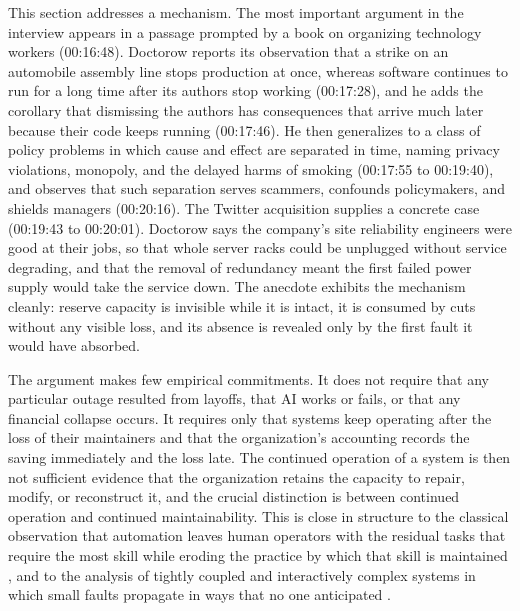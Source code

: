 \documentclass[12pt]{article}
\newcommand{\ts}[1]{(#1)}
\begin{document}
This section addresses a mechanism. The most important argument in the interview appears in a passage prompted by a book on organizing technology workers \ts{00:16:48}. Doctorow reports its observation that a strike on an automobile assembly line stops production at once, whereas software continues to run for a long time after its authors stop working \ts{00:17:28}, and he adds the corollary that dismissing the authors has consequences that arrive much later because their code keeps running \ts{00:17:46}. He then generalizes to a class of policy problems in which cause and effect are separated in time, naming privacy violations, monopoly, and the delayed harms of smoking \ts{00:17:55 to 00:19:40}, and observes that such separation serves scammers, confounds policymakers, and shields managers \ts{00:20:16}. The Twitter acquisition supplies a concrete case \ts{00:19:43 to 00:20:01}. Doctorow says the company's site reliability engineers were good at their jobs, so that whole server racks could be unplugged without service degrading, and that the removal of redundancy meant the first failed power supply would take the service down. The anecdote exhibits the mechanism cleanly: reserve capacity is invisible while it is intact, it is consumed by cuts without any visible loss, and its absence is revealed only by the first fault it would have absorbed.

The argument makes few empirical commitments. It does not require that any particular outage resulted from layoffs, that AI works or fails, or that any financial collapse occurs. It requires only that systems keep operating after the loss of their maintainers and that the organization's accounting records the saving immediately and the loss late. The continued operation of a system is then not sufficient evidence that the organization retains the capacity to repair, modify, or reconstruct it, and the crucial distinction is between continued operation and continued maintainability. This is close in structure to the classical observation that automation leaves human operators with the residual tasks that require the most skill while eroding the practice by which that skill is maintained \cite{bainbridge}, and to the analysis of tightly coupled and interactively complex systems in which small faults propagate in ways that no one anticipated \cite{perrow}.
\end{document}
